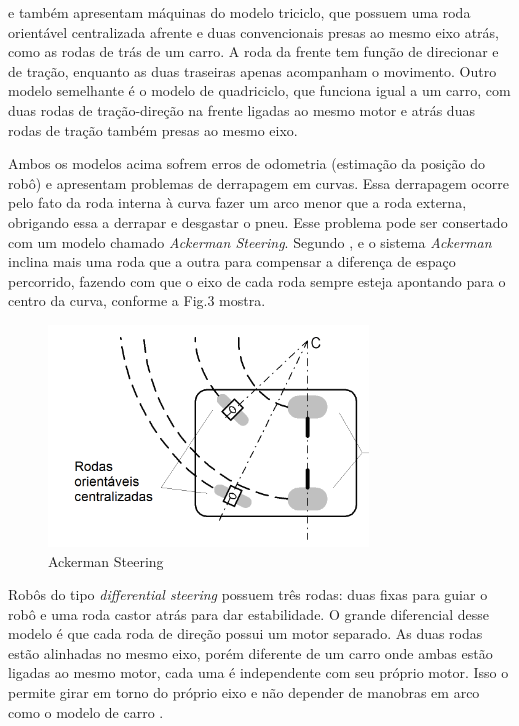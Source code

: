 \cite{Secchi2008} e \cite{Borenstein1996} também apresentam máquinas do modelo triciclo, que possuem uma roda orientável centralizada afrente e duas convencionais presas ao mesmo eixo atrás, como as rodas de trás de um carro. A roda da frente tem função de direcionar e de tração, enquanto as duas traseiras apenas acompanham o movimento. Outro modelo semelhante é o modelo de quadriciclo, que funciona igual a um carro, com duas rodas de tração-direção na frente ligadas ao mesmo motor e atrás duas rodas de tração também presas ao mesmo eixo. 

Ambos os modelos acima sofrem erros de odometria (estimação da posição do robô) e apresentam problemas de derrapagem em curvas. Essa derrapagem ocorre pelo fato da roda interna à curva fazer um arco menor que a roda externa, obrigando essa a derrapar e desgastar o pneu. Esse problema pode ser consertado com um modelo chamado \textit{Ackerman Steering}. Segundo \cite{Borenstein1996}, \cite{Secchi2008} e \cite{Bagnall2011} o sistema \textit{Ackerman} inclina mais uma roda que a outra para compensar a diferença de espaço percorrido, fazendo com que o eixo de cada roda sempre esteja apontando para o centro da curva, conforme a Fig.3 mostra.

\begin{figure}[h]
	\centering
	\label{fig03}
		\includegraphics[keepaspectratio=true,scale=1]{figuras/2ackerman.png}
	\caption{Ackerman Steering \cite{Secchi2008}}
\end{figure}

Robôs do tipo \textit{differential steering} possuem três rodas: duas fixas para guiar o robô e uma roda castor atrás para dar estabilidade. O grande diferencial desse modelo é que cada roda de direção possui um motor separado. As duas rodas estão alinhadas no mesmo eixo, porém diferente de um carro onde ambas estão ligadas ao mesmo motor, cada uma é independente com seu próprio motor. Isso o permite girar em torno do próprio eixo e não depender de manobras em arco como o modelo de carro \cite{Bagnall2011} \cite{Secchi2008} \cite{Mataric2007}.

